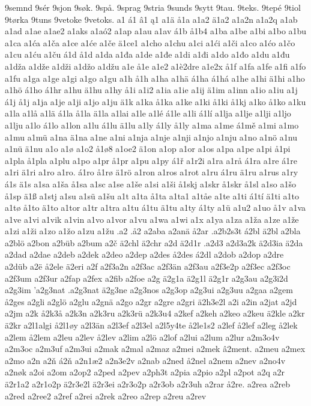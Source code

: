 9semnd
9sér
9sjon
9søk.
9spå.
9sprag
9stria
9sunds
9sytt
9tau.
9teks.
9tepé
9tiol
9tørka
9tuns
9vetoke
9vetoks.
a1
á1
â1
ą1
a1ä
å1a
a1a2
ä1a2
a1a2n
a1a2q
a1ab
a1ad
a1ae
a1ae2
a1aks
a1aó2
a1ap
a1au
a1av
á1b
å1b4
a1ba
a1be
a1bi
a1bo
a1bu
a1ca
a1ća
a1ča
a1ce
a1će
a1če
ä1ce1
a1cho
a1chu
a1ci
a1ći
a1či
a1co
a1ćo
a1čo
a1cu
a1ću
a1ču
á1d
å1d
a1da
a1đa
a1de
a1đe
a1di
a1đi
a1do
a1đo
a1du
a1đu
a1dža
a1dže
a1dži
a1džo
a1džu
a1e
å1e
a1e2
a1è2dre
a1e2x
å1f
a1fa
a1fe
a1fi
a1fo
a1fu
a1ga
a1ge
a1gi
a1go
a1gu
a1h
å1h
a1ha
a1hä
á1ha
á1há
a1he
a1hi
ä1hi
a1ho
a1hö
á1ho
á1hr
a1hu
ä1hu
a1hy
å1i
a1i2
a1ia
a1ie
a1ij
ä1im
a1inn
a1io
a1iu
a1j
á1j
å1j
a1ja
a1je
a1ji
a1jo
a1ju
ä1k
a1ka
å1ka
a1ke
a1ki
å1ki
å1kj
a1ko
å1ko
a1ku
a1la
a1lå
a1lä
á1la
å1la
ä1la
a1lai
a1le
a1lé
á1le
a1li
á1lí
a1lja
a1lje
a1lji
a1ljo
a1lju
a1lo
á1lo
a1lon
a1lu
á1lu
ä1lu
a1ly
á1ly
å1ly
a1ma
a1me
á1mě
a1mi
a1mo
a1mu
a1mü
a1na
ä1na
a1ne
a1ni
a1nja
a1nje
a1nji
a1njo
a1nju
a1no
a1nö
a1nu
a1nü
ä1nu
a1o
a1ø
a1o2
å1ø8
a1oe2
ä1on
a1op
a1or
a1os
a1pa
a1pe
a1pi
å1pi
a1pla
å1pla
a1plu
a1po
a1pr
å1pr
a1pu
a1py
á1ř
a1r2i
a1ra
a1rå
á1ra
a1re
á1re
a1ri
ä1ri
a1ro
a1ro.
á1ro
å1rø
ä1rö
a1ron
a1ros
a1rot
a1ru
á1ru
ä1ru
a1rus
a1ry
á1s
ä1s
a1sa
a1ša
å1sa
a1sc
a1se
a1še
a1si
a1ši
å1skj
a1skr
å1skr
å1sl
a1so
a1šo
å1sp
ä1ß
a1stj
a1su
a1sü
a1šu
a1t
a1ta
å1ta
a1ta1
a1tåe
a1te
a1ti
á1tí
ä1ti
a1to
a1tø
å1to
ä1to
a1tor
a1tr
a1tra
a1tu
á1tu
ä1tu
a1ty
á1ty
a1ü
a1u2
a1uo
å1v
a1va
a1ve
a1vi
a1vik
a1vin
a1vo
a1vor
a1vu
a1wa
a1wi
a1x
a1ya
a1za
a1ža
a1ze
a1že
a1zi
a1ži
a1zo
a1žo
a1zu
a1žu
.a2
.å2
a2aba
a2anä
å2ar
.a2b2s3t
á2bl
ä2bl
a2bla
a2blö
a2bon
a2büb
a2bum
a2č
ä2chl
ä2chr
a2d
ä2d1r
.a2d3
a2d3a2k
ä2d3ia
ä2da
a2dad
a2dae
a2deb
a2dek
a2deo
a2dep
a2des
å2des
á2dl
a2dob
a2dop
a2dre
a2düb
a2ë
å2ele
ä2eri
a2f
a2f3a2n
a2f3ac
a2f3än
a2f3au
a2f3e2p
a2f3ec
a2f3oc
a2f3um
a2f3ur
a2fap
a2fex
a2fib
a2foe
a2g
ä2g1a
ä2g1l
ä2g1r
a2g3au
a2g3i2d
a2g3im
'a2g3nat
.a2g3nat
ä2g3ne
a2g3nos
a2g3op
a2g3ui
a2g3uu
a2gaa
a2gem
å2ges
a2gli
a2glö
a2glu
a2gnä
a2go
a2gr
a2gre
a2gri
ä2h3e2l
a2i
a2in
a2jat
a2jd
a2jm
a2k
å2k3å
a2k3n
a2k3ru
a2k3rü
a2k3u4
a2kef
a2keh
a2keo
a2keu
ä2kle
a2kr
ä2kr
a2l1algi
å2l1øy
a2l3än
a2l3ef
a2l3el
a2l5y4te
å2le1s2
a2lef
å2lef
a2leg
å2lek
a2lem
å2lem
a2leu
a2lev
å2lev
a2lim
a2lö
a2lof
a2lui
a2lum
a2lur
a2m3o4v
a2m3oc
a2m3uf
a2m3ui
a2mak
a2mal
a2maz
a2mei
a2mek
â2ment.
a2meu
a2mex
a2mo
a2n
a2ň
á2ň
a2n1æ2
a2n3e2v
a2nab
a2ned
å2nel
a2nem
a2nev
a2no4v
a2nøk
a2oi
a2om
a2op2
a2ped
a2pev
a2ph3t
a2pia
a2pio
a2pl
a2pot
a2q
a2r
ä2r1a2
a2r1o2p
ä2r3e2l
ä2r3ei
a2r3o2p
a2r3ob
a2r3uh
a2rar
å2re.
a2rea
a2reb
a2red
a2ree2
a2ref
a2rei
a2rek
a2reo
a2rep
a2reu
a2rev
